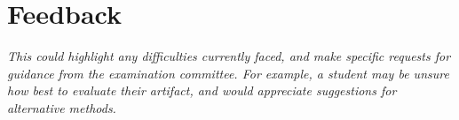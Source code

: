 \chapter*{Feedback}\label{C:feed} 

\textit{This could highlight any difficulties currently faced, and make specific requests for guidance from the examination committee. For example, a student may be unsure how best to evaluate their artifact, and would appreciate suggestions for alternative methods. 
}